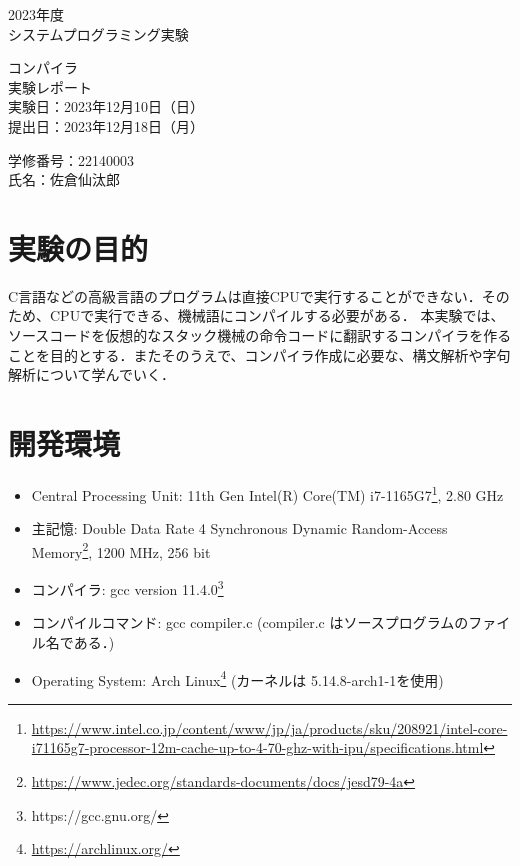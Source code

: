 \documentclass[fleqn, a4paper. 12pt]{ltjsarticle} %
\begin{document}
    \begin{titlepage}
      \begin{center}
      {
      \Huge 2023年度\\システムプログラミング実験}
      
      \vspace{4cm}
             {\Huge コンパイラ\\
               実験レポート\\}
             \vspace{4cm}
                    {\large 実験日：2023年12月10日（日）\\提出日：2023年12月18日（月）\\}
                    
                    {\large 学修番号：22140003\\氏名：佐倉仙汰郎}
    \end{center}  
  \end{titlepage}
  \newcommand{\fB}{f_\mathrm{B}}
  \newcommand{\fQ}{f_\mathrm{Q}}
  \newcommand{\fM}{f_\mathrm{M}}
  \newcommand{\fSTL}{f_\mathrm{STL}}
  
    \section{実験の目的}
    C言語などの高級言語のプログラムは直接CPUで実行することができない．そのため、CPUで実行できる、機械語にコンパイルする必要がある．
    本実験では、ソースコードを仮想的なスタック機械の命令コードに翻訳するコンパイラを作ることを目的とする．またそのうえで、コンパイラ作成に必要な、構文解析や字句解析について学んでいく．
    \section{開発環境}
    \begin{itemize}
      \item Central Processing Unit: 11th Gen Intel(R) Core(TM) i7-1165G7\footnote{\url{https://www.intel.co.jp/content/www/jp/ja/products/sku/208921/intel-core-i71165g7-processor-12m-cache-up-to-4-70-ghz-with-ipu/specifications.html}}, 2.80 GHz
      \item 主記憶: Double Data Rate 4 Synchronous Dynamic Random-Access Memory\footnote{\url{https://www.jedec.org/standards-documents/docs/jesd79-4a}}, 1200 MHz, 256 bit
      \item コンパイラ: gcc version 11.4.0\footnote{https://gcc.gnu.org/}
      \item コンパイルコマンド: gcc compiler.c (compiler.c はソースプログラムのファイル名である．)
      \item Operating System: Arch Linux\footnote{\url{https://archlinux.org/}} (カーネルは 5.14.8-arch1-1を使用)
  \end{itemize}
\end{document}
